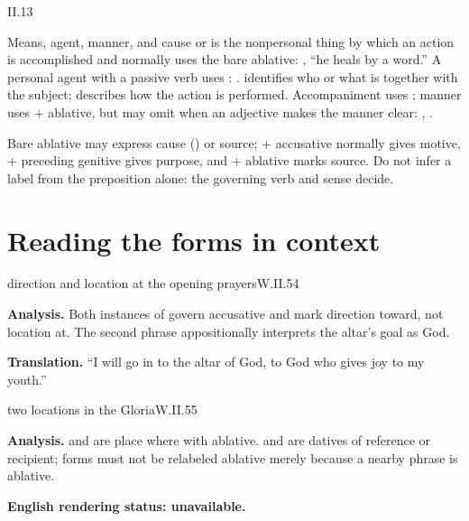\begin{courseunit}{II.13}
\begin{grammarbox}{Means, agent, manner, and cause}
 or  is the nonpersonal thing by which an action
is accomplished and normally uses the bare ablative: , ``he heals by a
word.''  A personal agent with a passive verb uses : .  identifies who or what is together with the
subject;  describes how the action is performed. Accompaniment
uses ; manner uses  + ablative, but may omit
 when an adjective makes the manner clear: , .

Bare ablative may express cause () or source;  +
accusative normally gives motive,  + preceding genitive gives purpose,
and  + ablative marks source.  Do not infer a label from the preposition alone:
the governing verb and sense decide.
\end{grammarbox}

\section{Reading the forms in context}

\begin{workedexample}{direction and location at the opening prayers}{W.II.54}

\textbf{Analysis.}  Both instances of  govern accusative and mark direction toward,
not location at.  The second phrase appositionally interprets the altar's goal as God.

\textbf{Translation.}  ``I will go in to the altar of God, to God who gives joy to my youth.''
\end{workedexample}

\begin{workedexample}{two locations in the Gloria}{W.II.55}

\textbf{Analysis.}   and  are place where with ablative.
 and  are datives of reference or recipient; forms must not be
relabeled ablative merely because a nearby phrase is ablative.

\textbf{English rendering status: unavailable.}
\end{workedexample}


\end{courseunit}
